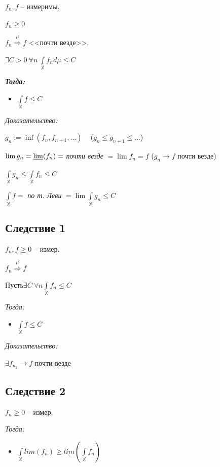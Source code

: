 \documentclass[paper=a4, fontsize=17pt]{article}
\begin{document}
$f_n, f$ -- измеримы,

$f_n \geq 0$

$f_n\stackrel{\mu}{\Rightarrow}f$ <<почти везде>>,

$\exists C > 0 ~ \forall n ~ \int\limits_{\mathbb{X}} f_n d\mu \leq C$

\textbf{\emph{Тогда:}}
\begin{itemize}
\item $\int\limits_{\mathbb{X}}f \leq C$
\end{itemize}

\emph{Доказательство:}

$ g_n := \inf(f_n, f_{n+1}, \dots ) $ ~ ($ g_n \leq g_{n+1} \leq \dots $)

$ \lim g_n = \varliminf(f_n) = $ \textit{почти везде} $ = \lim f_n  = f$ ($ g_n \rightarrow f $ почти везде)


$ \int\limits_{\mathbb{X}} g_n \leq \int\limits_{\mathbb{X}} f_n \leq C $

$ \int\limits_{\mathbb{X}} f = $ \textit{по т. Леви} $ = \lim \int\limits_{\mathbb{X}} g_n \leq C$

\subsection{Следствие 1}

$ f_n, f \geq 0$ -- измер.

$ f_n \stackrel{\mu}{\Rightarrow} f$

$ Пусть \exists C ~ \forall n  \int\limits_{\mathbb{X}} f_n \leq C $

\emph{Тогда:}
\begin{itemize}
	\item $ \int\limits_{\mathbb{X}}  f \leq C $
\end{itemize}

\emph{Доказательство:}

$ \exists f_{n_k} \rightarrow f $ почти везде

\subsection{Следствие 2}

$ f_n \geq 0 $ -- измер.

\emph{Тогда:}

\begin{itemize}
	\item $ \int\limits_{\mathbb{X}} \underline{lim}( f_n ) \geq \underline{lim}( \int\limits_{\mathbb{X}} f_n ) $
\end{itemize}
\end{document}
